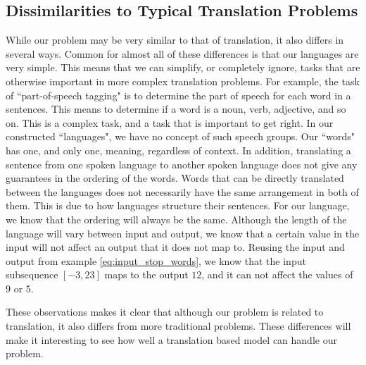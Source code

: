 \subsection{Dissimilarities to Typical Translation Problems}
While our problem may be very similar to that of translation, it also differs in several ways. Common for almost all of these differences is that our languages are very simple. This means that we can simplify, or completely ignore, tasks that are otherwise important in more complex translation problems. For example, the task of ``part-of-speech tagging" is to determine the part of speech for each word in a sentences. This means to determine if a word is a noun, verb, adjective, and so on. This is a complex task, and a task that is important to get right. In our constructed ``languages", we have no concept of such speech groups. Our ``words" has one, and only one, meaning, regardless of context. In addition, translating a sentence from one spoken language to another spoken language does not give any guarantees in the ordering of the words. Words that can be directly translated between the languages does not necessarily have the same arrangement in both of them. This is due to how languages structure their sentences. For our language, we know that the ordering will always be the same. Although the length of the language will vary between input and output, we know that a certain value in the input will not affect an output that it does not map to. Reusing the input and output from example \ref{eq:input_stop_words}, we know that the input subsequence \([-3, 23]\) maps to the output \(12\), and it can not affect the values of \(9\) or \(5\).

These observations makes it clear that although our problem is related to translation, it also differs from more traditional problems. These differences will make it interesting to see how well a translation based model can handle our problem.